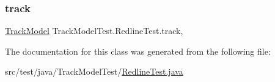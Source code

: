 \mbox{\label{classTrackModelTest_1_1RedlineTest_afbab32bc166ca48e7544b8c3908f95e3}} 
\subsubsection{\texorpdfstring{track}{track}}
{\footnotesize\ttfamily \hyperlink{classTrackModel_1_1TrackModel}{Track\+Model} Track\+Model\+Test.\+Redline\+Test.\+track\hspace{0.3cm}{\ttfamily [static]}, {\ttfamily [private]}}



The documentation for this class was generated from the following file\+:\begin{DoxyCompactItemize}
\item 
src/test/java/\+Track\+Model\+Test/\hyperlink{RedlineTest_8java}{Redline\+Test.\+java}\end{DoxyCompactItemize}
